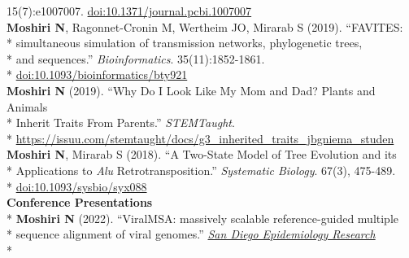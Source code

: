 \documentclass[margin,line]{res}
\begin{document}
\begin{resume}
\hspace*{8mm} 15(7):e1007007. \href{https://doi.org/10.1371/journal.pcbi.1007007}{doi:10.1371/journal.pcbi.1007007}\\
\hspace*{4mm} \textbf{Moshiri N}, Ragonnet-Cronin M, Wertheim JO, Mirarab S (2019). ``FAVITES:\\*
\hspace*{9mm} simultaneous simulation of transmission networks, phylogenetic trees,\\*
\hspace*{9mm} and sequences.'' \textit{Bioinformatics}. 35(11):1852-1861.\\*\vspace{2mm}
\hspace*{8mm} \href{https://doi.org/10.1093/bioinformatics/bty921}{doi:10.1093/bioinformatics/bty921}\\
\hspace*{4mm} \textbf{Moshiri N} (2019). ``Why Do I Look Like My Mom and Dad? Plants and Animals\\*
\hspace*{9mm} Inherit Traits From Parents.'' \textit{STEMTaught}.\\*\vspace{2mm}
\hspace*{8mm} \href{https://issuu.com/stemtaught/docs/g3_inherited_traits_jbgniema_studen}{https://issuu.com/stemtaught/docs/g3\_inherited\_traits\_jbgniema\_studen}\\
\hspace*{4mm} \textbf{Moshiri N}, Mirarab S (2018). ``A Two-State Model of Tree Evolution and its\\*
\hspace*{9mm} Applications to \textit{Alu} Retrotransposition.'' \textit{Systematic Biology}. 67(3), 475-489.\\*\vspace{2mm}
\hspace*{8mm} \href{https://doi.org/10.1093/sysbio/syx088}{doi:10.1093/sysbio/syx088}
~\\
\textbf{Conference Presentations}\vspace{2mm}\\*
\hspace*{4mm} \textbf{Moshiri N} (2022). ``ViralMSA: massively scalable reference-guided multiple\\*
\hspace*{9mm} sequence alignment of viral genomes.'' \href{https://publichealth.sdsu.edu/epiexchange}{\textit{San Diego Epidemiology Research}}\\*\vspace{2mm}

\end{resume}
\end{document}
